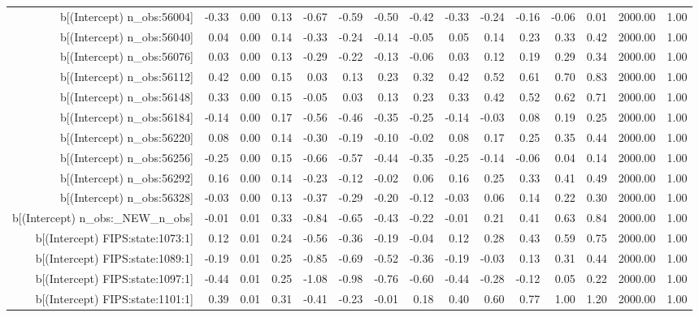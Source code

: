 \begin{table}[ht]
\begin{tabular}{rrrrrrrrrrrrrrr}
  b[(Intercept) n\_obs:56004] & -0.33 & 0.00 & 0.13 & -0.67 & -0.59 & -0.50 & -0.42 & -0.33 & -0.24 & -0.16 & -0.06 & 0.01 & 2000.00 & 1.00 \\ 
  b[(Intercept) n\_obs:56040] & 0.04 & 0.00 & 0.14 & -0.33 & -0.24 & -0.14 & -0.05 & 0.05 & 0.14 & 0.23 & 0.33 & 0.42 & 2000.00 & 1.00 \\ 
  b[(Intercept) n\_obs:56076] & 0.03 & 0.00 & 0.13 & -0.29 & -0.22 & -0.13 & -0.06 & 0.03 & 0.12 & 0.19 & 0.29 & 0.34 & 2000.00 & 1.00 \\ 
  b[(Intercept) n\_obs:56112] & 0.42 & 0.00 & 0.15 & 0.03 & 0.13 & 0.23 & 0.32 & 0.42 & 0.52 & 0.61 & 0.70 & 0.83 & 2000.00 & 1.00 \\ 
  b[(Intercept) n\_obs:56148] & 0.33 & 0.00 & 0.15 & -0.05 & 0.03 & 0.13 & 0.23 & 0.33 & 0.42 & 0.52 & 0.62 & 0.71 & 2000.00 & 1.00 \\ 
  b[(Intercept) n\_obs:56184] & -0.14 & 0.00 & 0.17 & -0.56 & -0.46 & -0.35 & -0.25 & -0.14 & -0.03 & 0.08 & 0.19 & 0.25 & 2000.00 & 1.00 \\ 
  b[(Intercept) n\_obs:56220] & 0.08 & 0.00 & 0.14 & -0.30 & -0.19 & -0.10 & -0.02 & 0.08 & 0.17 & 0.25 & 0.35 & 0.44 & 2000.00 & 1.00 \\ 
  b[(Intercept) n\_obs:56256] & -0.25 & 0.00 & 0.15 & -0.66 & -0.57 & -0.44 & -0.35 & -0.25 & -0.14 & -0.06 & 0.04 & 0.14 & 2000.00 & 1.00 \\ 
  b[(Intercept) n\_obs:56292] & 0.16 & 0.00 & 0.14 & -0.23 & -0.12 & -0.02 & 0.06 & 0.16 & 0.25 & 0.33 & 0.41 & 0.49 & 2000.00 & 1.00 \\ 
  b[(Intercept) n\_obs:56328] & -0.03 & 0.00 & 0.13 & -0.37 & -0.29 & -0.20 & -0.12 & -0.03 & 0.06 & 0.14 & 0.22 & 0.30 & 2000.00 & 1.00 \\ 
  b[(Intercept) n\_obs:\_NEW\_n\_obs] & -0.01 & 0.01 & 0.33 & -0.84 & -0.65 & -0.43 & -0.22 & -0.01 & 0.21 & 0.41 & 0.63 & 0.84 & 2000.00 & 1.00 \\ 
  b[(Intercept) FIPS:state:1073:1] & 0.12 & 0.01 & 0.24 & -0.56 & -0.36 & -0.19 & -0.04 & 0.12 & 0.28 & 0.43 & 0.59 & 0.75 & 2000.00 & 1.00 \\ 
  b[(Intercept) FIPS:state:1089:1] & -0.19 & 0.01 & 0.25 & -0.85 & -0.69 & -0.52 & -0.36 & -0.19 & -0.03 & 0.13 & 0.31 & 0.44 & 2000.00 & 1.00 \\ 
  b[(Intercept) FIPS:state:1097:1] & -0.44 & 0.01 & 0.25 & -1.08 & -0.98 & -0.76 & -0.60 & -0.44 & -0.28 & -0.12 & 0.05 & 0.22 & 2000.00 & 1.00 \\ 
  b[(Intercept) FIPS:state:1101:1] & 0.39 & 0.01 & 0.31 & -0.41 & -0.23 & -0.01 & 0.18 & 0.40 & 0.60 & 0.77 & 1.00 & 1.20 & 2000.00 & 1.00 \\ 

\end{tabular}
\end{table}
